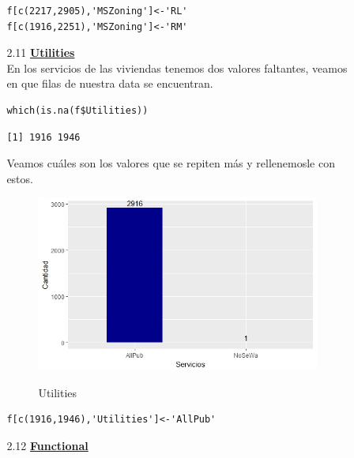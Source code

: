 \documentclass{report}
\begin{document}
\begin{itemize}
\begin{itemize}
\begin{itemize}
\begin{lstlisting}[frame=single]
f[c(2217,2905),'MSZoning']<-'RL'
f[c(1916,2251),'MSZoning']<-'RM'
\end{lstlisting}
\vspace{2mm}

\item[2.11] \textbf{\underline{Utilities}}\\

En los servicios de las viviendas tenemos dos valores faltantes, veamos en que filas de nuestra data se encuentran.\\

\begin{lstlisting}[frame=single]
which(is.na(f$Utilities))
\end{lstlisting}
\begin{lstlisting}[frame=single]
[1] 1916 1946
\end{lstlisting}
\vspace{2mm}

Veamos cuáles son los valores que se repiten más y rellenemosle con estos.\\


\begin{figure}[h]
	\centering
	\includegraphics[scale=0.7]{Servicios.JPEG}
	\label{p1}
	\caption{Utilities}
\end{figure}

\newpage

\begin{lstlisting}[frame=single]
f[c(1916,1946),'Utilities']<-'AllPub'
\end{lstlisting}
\vspace{2mm}

\item[2.12] \textbf{\underline{Functional}}\\


\end{itemize}
\end{itemize}
\end{itemize}
\end{document}
